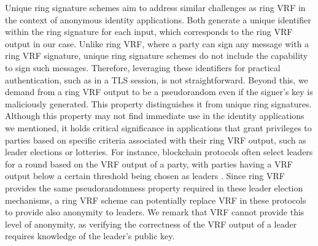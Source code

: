 Unique ring signature schemes \cite{URCframework} aim to address similar challenges as ring VRF in the context of anonymous identity applications. Both generate a unique identifier within the ring signature for each input, which corresponds to the ring VRF output in our case. Unlike ring VRF, where a party can sign any message with a ring VRF signature, unique ring signature schemes do not include the capability to sign such messages. Therefore, leveraging these identifiers for practical authentication, such as in a TLS session, is not straightforward. 
Beyond this, we demand from a ring VRF output  to be a pseudorandom even if the signer's key is maliciously generated. This property distinguishes it from unique ring signatures. 
Although this property may not find immediate use in the identity applications we mentioned, it holds critical significance in applications that grant privileges to parties based on specific criteria associated with their ring VRF output, such as leader elections or lotteries. 
For instance, blockchain protocols often select leaders for a round based on the VRF output of a party, with parties having a VRF output below a certain threshold being chosen as leaders \cite{praos,genesis}. Since ring VRF provides the same pseudorandomness property required in these leader election mechanisms, a ring VRF scheme  can potentially replace VRF in these protocols to provide also anonymity to leaders. 
We remark that VRF cannot provide this level of anonymity, as verifying the correctness of the VRF output of a leader requires knowledge of the leader's public key.

